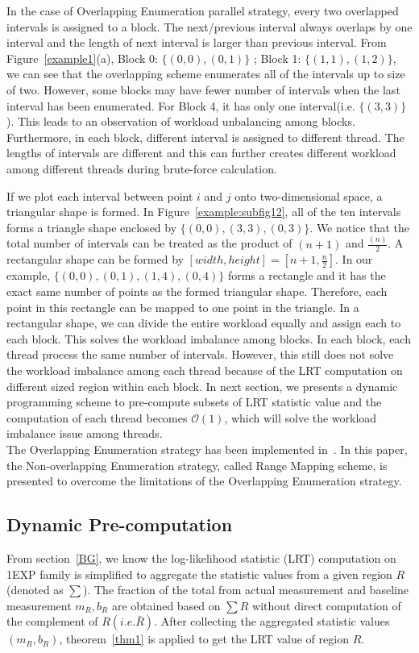 \documentclass[AMA,LATO1COL]{WileyNJD-v2}
\newcommand\bigo{\mathcal O}
\begin{document}
  In the case of Overlapping Enumeration parallel strategy, every two overlapped intervals is assigned to a block. The next/previous interval always overlaps by one interval and the length of next interval is larger than previous interval.  From Figure~\ref{example1}(a), Block 0: $\{(0,0),(0,1)\}$ ; Block 1: $\{(1,1),(1,2)\}$, we can see that the overlapping scheme enumerates all of the intervals up to size of two. However, some blocks may have fewer number of intervals when the last interval has been enumerated. For Block 4, it has only one interval(i.e. $\{(3,3)\}$). This leads to an observation of workload unbalancing among blocks. Furthermore, in each block, different interval is assigned to different thread. The lengths of intervals are different and this can further creates different workload among different threads during brute-force calculation.

If we plot each interval between point $i$ and $j$ onto two-dimensional space, a triangular shape is formed. In Figure~\ref{example:subfig12}, all of the ten intervals forms a triangle shape enclosed by $\{(0,0),(3,3),(0,3)\}$. We notice that the total number of intervals can be treated as the product of $(n+1)$ and ${\frac{(n)}{2}}$. A rectangular shape can be formed by $[width,height]=[n+1,{\frac{n}{2}}]$. In our example, $\{(0,0),(0,1),(1,4),(0,4)\}$ forms a rectangle and it has the exact same number of points as the formed triangular shape. Therefore, each point in this rectangle can be mapped to one point in the triangle. In a rectangular shape, we can divide the entire workload equally and assign each to each block. This solves the workload imbalance among blocks. In each block, each thread process the same number of intervals. However, this still does not solve the workload imbalance among each thread because of the LRT computation on different sized region within each block. In next section, we presents a dynamic programming scheme to pre-compute subsets of LRT statistic value and the computation of each thread becomes $\bigo(1)$, which will solve the workload imbalance issue among threads. \\
The Overlapping Enumeration strategy has been implemented in~\cite{apweb}. In this paper, the Non-overlapping Enumeration strategy, called Range Mapping scheme, is presented to overcome the limitations of the Overlapping Enumeration strategy.

\subsection{Dynamic Pre-computation}
\label{sec:mov2}
From section~\ref{BG}, we know the log-likelihood statistic (LRT) computation on 1EXP family is simplified to aggregate the statistic values from a given region $R$ (denoted as $\sum $). The fraction of the total from actual measurement and baseline measurement $m_R,b_R$ are obtained based on $\sum R$ without direct computation of the complement of $R (i.e. \bar R)$. After collecting the aggregated statistic values $(m_R,b_R)$, theorem~\ref{thm1} is applied to get the LRT value of region $R$.
\end{document}
